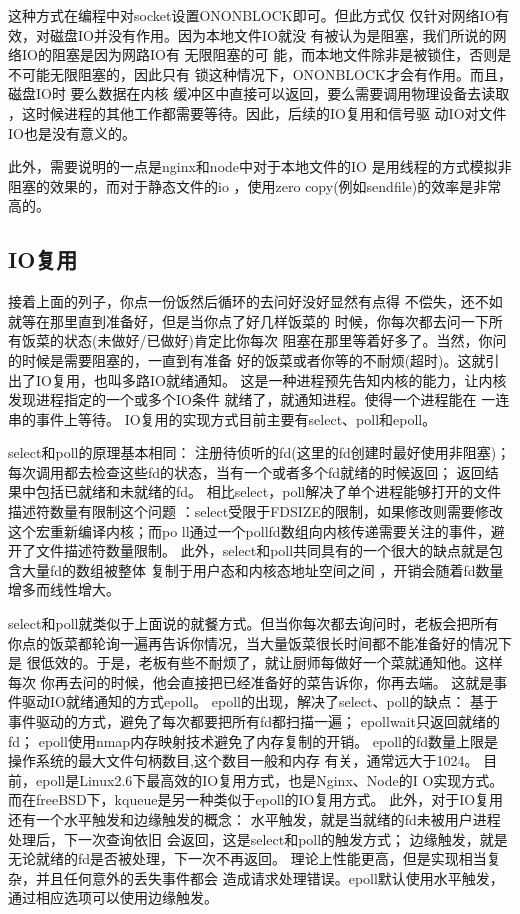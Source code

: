 	这种方式在编程中对socket设置ONONBLOCK即可。但此方式仅
	仅针对网络IO有效，对磁盘IO并没有作用。因为本地文件IO就没
	有被认为是阻塞，我们所说的网络IO的阻塞是因为网路IO有
	无限阻塞的可
	能，而本地文件除非是被锁住，否则是不可能无限阻塞的，因此只有
	锁这种情况下，ONONBLOCK才会有作用。而且，磁盘IO时
	要么数据在内核
	缓冲区中直接可以返回，要么需要调用物理设备去读取
	，这时候进程的其他工作都需要等待。因此，后续的IO复用和信号驱
	动IO对文件IO也是没有意义的。
	
	此外，需要说明的一点是nginx和node中对于本地文件的IO
	是用线程的方式模拟非阻塞的效果的，而对于静态文件的io
	，使用zero copy(例如sendfile)的效率是非常高的。
\subsection{IO复用}

接着上面的列子，你点一份饭然后循环的去问好没好显然有点得
不偿失，还不如就等在那里直到准备好，但是当你点了好几样饭菜的
时候，你每次都去问一下所有饭菜的状态(未做好/已做好)肯定比你每次
阻塞在那里等着好多了。当然，你问的时候是需要阻塞的，一直到有准备
好的饭菜或者你等的不耐烦(超时)。这就引出了IO复用，也叫多路IO就绪通知。
这是一种进程预先告知内核的能力，让内核发现进程指定的一个或多个IO条件
就绪了，就通知进程。使得一个进程能在
一连串的事件上等待。
IO复用的实现方式目前主要有select、poll和epoll。

select和poll的原理基本相同：
注册待侦听的fd(这里的fd创建时最好使用非阻塞)；
每次调用都去检查这些fd的状态，当有一个或者多个fd就绪的时候返回；
返回结果中包括已就绪和未就绪的fd。
相比select，poll解决了单个进程能够打开的文件描述符数量有限制这个问题
：select受限于FDSIZE的限制，如果修改则需要修改这个宏重新编译内核；而po
ll通过一个pollfd数组向内核传递需要关注的事件，避开了文件描述符数量限制。
此外，select和poll共同具有的一个很大的缺点就是包含大量fd的数组被整体
复制于用户态和内核态地址空间之间
，开销会随着fd数量增多而线性增大。

select和poll就类似于上面说的就餐方式。但当你每次都去询问时，老板会把所有
你点的饭菜都轮询一遍再告诉你情况，当大量饭菜很长时间都不能准备好的情况下是
很低效的。于是，老板有些不耐烦了，就让厨师每做好一个菜就通知他。这样每次
你再去问的时候，他会直接把已经准备好的菜告诉你，你再去端。
这就是事件驱动IO就绪通知的方式epoll。
epoll的出现，解决了select、poll的缺点：
基于事件驱动的方式，避免了每次都要把所有fd都扫描一遍；
epollwait只返回就绪的fd；
epoll使用nmap内存映射技术避免了内存复制的开销。
epoll的fd数量上限是操作系统的最大文件句柄数目,这个数目一般和内存
有关，通常远大于1024。
目前，epoll是Linux2.6下最高效的IO复用方式，也是Nginx、Node的I
O实现方式。而在freeBSD下，kqueue是另一种类似于epoll的IO复用方式。
此外，对于IO复用还有一个水平触发和边缘触发的概念：
水平触发，就是当就绪的fd未被用户进程处理后，下一次查询依旧
会返回，这是select和poll的触发方式；
边缘触发，就是无论就绪的fd是否被处理，下一次不再返回。
理论上性能更高，但是实现相当复杂，并且任何意外的丢失事件都会
造成请求处理错误。epoll默认使用水平触发，通过相应选项可以使用边缘触发。
